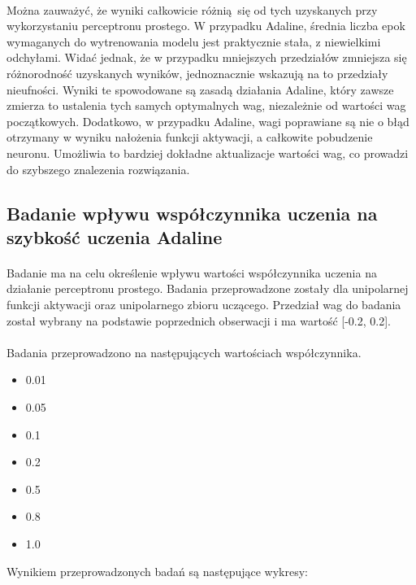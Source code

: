 \documentclass[\main/main.tex]{subfiles}
\begin{document}
    \paragraph{}
    Można zauważyć, że wyniki całkowicie różnią się od tych uzyskanych przy wykorzystaniu perceptronu prostego. W przypadku Adaline, średnia liczba epok wymaganych do wytrenowania modelu jest praktycznie stała, z niewielkimi odchyłami. Widać jednak, że w przypadku mniejszych przedziałów zmniejsza się różnorodność uzyskanych wyników, jednoznacznie wskazują na to przedziały nieufności. Wyniki te spowodowane są zasadą działania Adaline, który zawsze zmierza to ustalenia tych samych optymalnych wag, niezależnie od wartości wag początkowych. Dodatkowo, w przypadku Adaline, wagi poprawiane są nie o błąd otrzymany w wyniku nałożenia funkcji aktywacji, a całkowite pobudzenie neuronu. Umożliwia to bardziej dokładne aktualizacje wartości wag, co prowadzi do szybszego znalezenia rozwiązania.

    \justify
    \subsection{Badanie wpływu współczynnika uczenia  na szybkość uczenia Adaline}
    \paragraph{}
    Badanie ma na celu określenie wpływu wartości współczynnika uczenia na działanie perceptronu prostego. Badania przeprowadzone zostały dla unipolarnej funkcji aktywacji oraz unipolarnego zbioru uczącego. Przedział wag do badania został wybrany na podstawie poprzednich obserwacji i ma wartość [-0.2, 0.2].
    
    \paragraph{}
    Badania przeprowadzono na następujących wartościach współczynnika.
    \begin{itemize}
    \item 0.01
    \item 0.05
    \item 0.1
    \item 0.2
    \item 0.5
    \item 0.8
    \item 1.0
    \end{itemize}
    
    Wynikiem przeprowadzonych badań są następujące wykresy:
    
\end{document}
